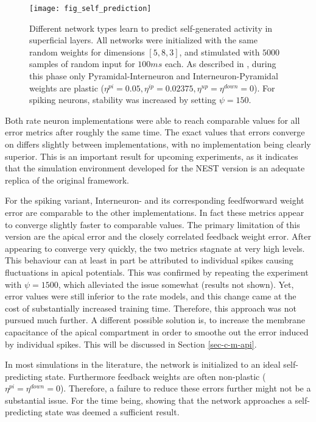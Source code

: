 \begin{figure}[t]
    \centering
    \texttt{[image: fig\_self\_prediction]}
    \caption{Different network types learn to predict self-generated activity in superficial layers. All networks were
        initialized with the same random weights for dimensions $[5, 8, 3]$, and stimulated with $5000$ samples of
        random input for $100ms$ each. As described in \cite{sacramento2018dendritic}, during this phase only
        Pyramidal-Interneuron and Interneuron-Pyramidal weights are plastic ($\eta^{pi}=0.05, \eta^{ip}=0.02375,
            \eta^{up}=\eta^{down}=0$). For spiking neurons, stability was increased by setting $\psi=150$.}
    \label{fig-self-pred}
\end{figure}

Both rate neuron implementations were able to reach comparable values for all error metrics after roughly the same
time. The exact values that errors converge on differs slightly between implementations, with no implementation being
clearly superior. This is an important result for upcoming experiments, as it indicates that the simulation environment
developed for the NEST version is an adequate replica of the original framework.

For the spiking variant, Interneuron- and its corresponding feedfworward weight error are comparable to the other
implementations. In fact these metrics appear to converge slightly faster to comparable values. The primary limitation
of this version are the apical error and the closely correlated feedback weight error. After appearing to converge very
quickly, the two metrics stagnate at very high levels. This behaviour can at least in part be attributed to individual
spikes causing fluctuations in apical potentials. This was confirmed by repeating the experiment with $\psi=1500$, which
alleviated the issue somewhat (results not shown). Yet, error values were still inferior to the rate models, and this
change came at the cost of substantially increased training time. Therefore, this approach was not pursued much further.
A different possible solution is, to increase the membrane capacitance of the apical compartment in order to smoothe
out the error induced by individual spikes. This will be discussed in Section \ref{sec-c-m-api}.

In most simulations in the literature, the network is initialized to an ideal self-predicting state. Furthermore
feedback weights are often non-plastic ($\eta^{pi}=\eta^{down}=0$). Therefore, a failure to reduce these errors further
might not be a substantial issue. For the time being, showing that the network approaches a self-predicting state was
deemed a sufficient result.


